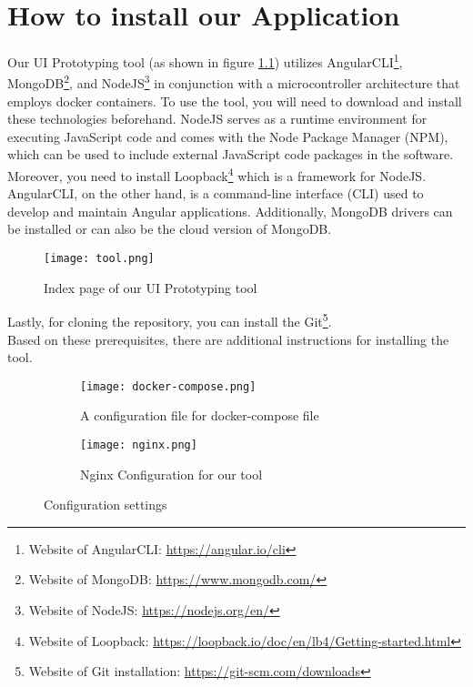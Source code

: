\chapter{How to install our Application} 
\label{appendix:one:installation}
\ifpdf
    \graphicspath{{Appendix1/Figs/}{Appendix1/Figs/}{Appendix1/Figs/}}
\else
    \graphicspath{{Appendix1/Figs/}{Appendix1/Figs/}}
\fi
Our UI Prototyping tool (as shown in figure \ref{fig:appendix:installation:tool}) utilizes AngularCLI\footnote{Website of AngularCLI: \url{https://angular.io/cli}}, MongoDB\footnote{Website of MongoDB: \url{https://www.mongodb.com/}}, and NodeJS\footnote{Website of NodeJS: \url{https://nodejs.org/en/}} in conjunction with a microcontroller architecture that employs docker containers. 
To use the tool, you will need to download and install these technologies beforehand.
NodeJS serves as a runtime environment for executing JavaScript code and comes with the Node Package Manager (NPM), which can be used to include external JavaScript code packages in the software. 
Moreover, you need to install Loopback\footnote{Website of Loopback: \url{https://loopback.io/doc/en/lb4/Getting-started.html}} which is a framework for NodeJS.
AngularCLI, on the other hand, is a command-line interface (CLI) used to develop and maintain Angular applications. 
Additionally, MongoDB drivers can be installed or can also be the cloud version of MongoDB. 
\begin{figure}[htbp!]
	\centering    
	\texttt{[image: tool.png]}
	\caption[UI Prototyping tool]{Index page of our UI Prototyping tool}
	\label{fig:appendix:installation:tool}
\end{figure}
Lastly, for cloning the repository, you can install the Git\footnote{Website of Git installation: \url{https://git-scm.com/downloads}}.\\
Based on these prerequisites, there are additional instructions for installing the tool.

\begin{figure}[htbp]
	\begin{subfigure}[b]{0.55\textwidth}
	  \centering
	  \texttt{[image: docker-compose.png]}
	\caption[Docker configuration]{A configuration file for docker-compose file}
	\label{fig:appendix:installation:dockerCompose}   
	\end{subfigure}
	\begin{subfigure}[b]{0.55\textwidth}
	  \centering
	  \texttt{[image: nginx.png]}
	\caption[Nginx Configuration]{Nginx Configuration for our tool}
	\label{fig:appendix:installation:nginx}
	\end{subfigure} 
	\caption{Configuration settings}
	\label{fig:appendix:configuration}
\end{figure}

